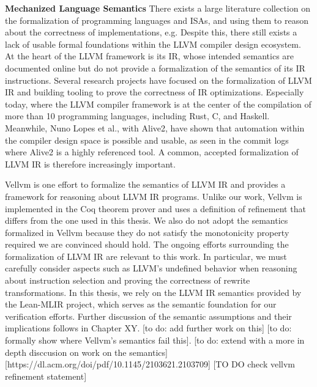 \textbf{Mechanized Language Semantics}
There exists a large literature collection on the formalization of programming languages and ISAs, and using them to reason about the correctness of implementations, e.g.
Despite this, there still exists a lack of usable formal foundations within the LLVM compiler design ecosystem. At the heart of the LLVM framework is its IR, whose intended semantics are documented online but do not provide a formalization of the semantics of its IR instructions. Several research projects have focused on the formalization of LLVM IR and building tooling to prove the correctness of IR optimizations. Especially today, where the LLVM compiler framework is at the center of the compilation of more than 10 programming languages, including Rust, C, and Haskell. Meanwhile, Nuno Lopes et al., with Alive2, have shown that automation within the compiler design space is possible and usable, as seen in the commit logs where Alive2 is a highly referenced tool. A common, accepted formalization of LLVM IR is therefore increasingly important.

Vellvm is one effort to formalize the semantics of LLVM IR and provides a framework for reasoning about LLVM IR programs. Unlike our work, Vellvm is implemented in the Coq theorem prover and uses a definition of refinement that differs from the one used in this thesis. We also do not adopt the semantics formalized in Vellvm because they do not satisfy the monotonicity property required we are convinced should hold.
The ongoing efforts surrounding the formalization of LLVM IR are relevant to this work. In particular, we must carefully consider aspects such as LLVM’s undefined behavior when reasoning about instruction selection and proving the correctness of rewrite transformations. In this thesis, we rely on the LLVM IR semantics provided by the Lean-MLIR project, which serves as the semantic foundation for our verification efforts. Further discussion of the semantic assumptions and their implications follows in Chapter XY.
[to do: add further work on this]
[to do: formally show where Vellvm's semantics fail this].
[to do: extend with a more in depth disccusion on work on the semantics]
[https://dl.acm.org/doi/pdf/10.1145/2103621.2103709]
[TO DO check vellvm refinement statement]


